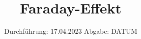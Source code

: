 

\subject{VERSUCH 46}
\title{Faraday-Effekt}
\date{%
  Durchführung: 17.04.2023
  \hspace{3em}
  Abgabe: DATUM
}



\maketitle
\thispagestyle{empty}
\tableofcontents
\newpage






\printbibliography{}


